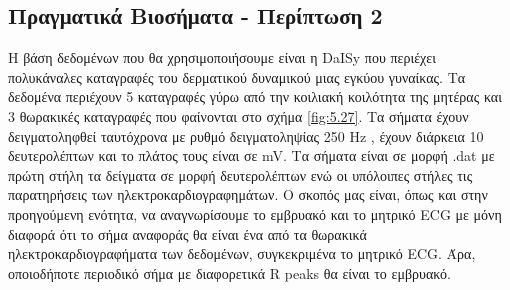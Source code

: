 \subsection{Πραγματικά Βιοσήματα - Περίπτωση 2}
\justifying
Η βάση δεδομένων που θα χρησιμοποιήσουμε είναι η \en DaISy \gr \cite{daisy:24} που περιέχει πολυκάναλες καταγραφές του δερματικού δυναμικού μιας εγκύου γυναίκας. Τα δεδομένα περιέχουν 5 καταγραφές γύρω από την κοιλιακή κοιλότητα της μητέρας και 3 θωρακικές καταγραφές που φαίνονται στο σχήμα \ref{fig:5.27}. Τα σήματα έχουν δειγματοληφθεί ταυτόχρονα με ρυθμό δειγματοληψίας 250 \en Hz \gr, έχουν διάρκεια 10 δευτερολέπτων και το πλάτος τους είναι σε \en mV. \gr Τα σήματα είναι σε μορφή \en .dat \gr με πρώτη στήλη τα δείγματα σε μορφή δευτερολέπτων ενώ οι υπόλοιπες στήλες τις παρατηρήσεις των ηλεκτροκαρδιογραφημάτων. 
\newpage
\noindent Ο σκοπός μας είναι, όπως και στην προηγούμενη ενότητα, να αναγνωρίσουμε το εμβρυακό και το μητρικό \en ECG \gr με μόνη διαφορά ότι το σήμα αναφοράς θα είναι ένα από τα θωρακικά ηλεκτροκαρδιογραφήματα των δεδομένων, συγκεκριμένα το μητρικό \en ECG. \gr Άρα, οποιοδήποτε περιοδικό σήμα με διαφορετικά \en R peaks \gr θα είναι το εμβρυακό.
